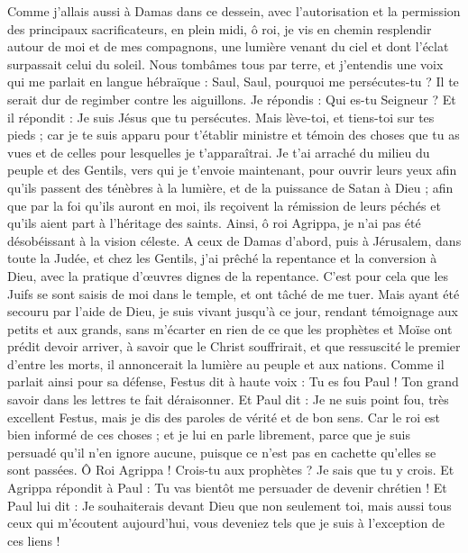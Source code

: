 \begin{multicols}{2}
Comme j'allais aussi à Damas dans ce dessein, avec l'autorisation et la permission des principaux sacrificateurs,
en plein midi, ô roi, je vis en chemin resplendir autour de moi et de mes compagnons, une lumière venant du ciel et dont l'éclat surpassait celui du soleil.
Nous tombâmes tous par terre, et j'entendis une voix qui me parlait en langue hébraïque : Saul, Saul, pourquoi me persécutes-tu ? Il te serait dur de regimber contre les aiguillons.
Je répondis : Qui es-tu Seigneur ? Et il répondit : Je suis Jésus que tu persécutes.
Mais lève-toi, et tiens-toi sur tes pieds ; car je te suis apparu pour t'établir ministre et témoin des choses que tu as vues et de celles pour lesquelles je t'apparaîtrai.
Je t'ai arraché du milieu du peuple et des Gentils, vers qui je t'envoie maintenant,
pour ouvrir leurs yeux afin qu'ils passent des ténèbres à la lumière, et de la puissance de Satan à Dieu ; afin que par la foi qu'ils auront en moi, ils reçoivent la rémission de leurs péchés et qu'ils aient part à l'héritage des saints.
Ainsi, ô roi Agrippa, je n'ai pas été désobéissant à la vision céleste.
A ceux de Damas d'abord, puis à Jérusalem, dans toute la Judée, et chez les Gentils, j'ai prêché la repentance et la conversion à Dieu, avec la pratique d'œuvres dignes de la repentance.
C'est pour cela que les Juifs se sont saisis de moi dans le temple, et ont tâché de me tuer.
Mais ayant été secouru par l'aide de Dieu, je suis vivant jusqu'à ce jour, rendant témoignage aux petits et aux grands, sans m'écarter en rien de ce que les prophètes et Moïse ont prédit devoir arriver,
à savoir que le Christ souffrirait, et que ressuscité le premier d'entre les morts, il annoncerait la lumière au peuple et aux nations.
Comme il parlait ainsi pour sa défense, Festus dit à haute voix : Tu es fou Paul ! Ton grand savoir dans les lettres te fait déraisonner.
Et Paul dit : Je ne suis point fou, très excellent Festus, mais je dis des paroles de vérité et de bon sens.
Car le roi est bien informé de ces choses ; et je lui en parle librement, parce que je suis persuadé qu'il n'en ignore aucune, puisque ce n'est pas en cachette qu'elles se sont passées.
Ô Roi Agrippa ! Crois-tu aux prophètes ? Je sais que tu y crois.
Et Agrippa répondit à Paul : Tu vas bientôt me persuader de devenir chrétien !
Et Paul lui dit : Je souhaiterais devant Dieu que non seulement toi, mais aussi tous ceux qui m'écoutent aujourd'hui, vous deveniez tels que je suis à l'exception de ces liens !

\end{multicols}
